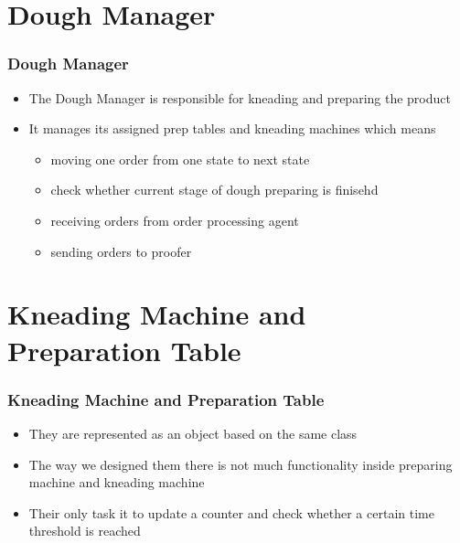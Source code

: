 \documentclass[hyperref={pdfpagelabels=false}]{beamer}
\begin{document}
    \section{Dough Manager}
    \begin{frame}
        \frametitle{Dough Manager}
        \begin{itemize}
            \item The Dough Manager is responsible for kneading and preparing the product
            \item It manages its assigned prep tables and kneading machines which means
            \begin{itemize}
                \item moving one order from one state to next state
                \item check whether current stage of dough preparing is finisehd
                \item receiving orders from order processing agent
                \item sending orders to proofer
            \end{itemize}
        \end{itemize}
    \end{frame}


    \section{Kneading Machine and Preparation Table}
    \begin{frame}
        \frametitle{Kneading Machine and Preparation Table}
        \begin{itemize}
            \item They are represented as an object based on the same class
            \item The way we designed them there is not much functionality inside preparing machine and kneading machine
            \item Their only task it to update a counter and check whether a certain time threshold is reached
        \end{itemize}
    \end{frame}
\end{document}
